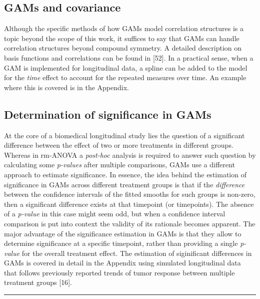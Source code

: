 \documentclass[
]{article}
\begin{document}
\newpage

\hypertarget{gams-and-covariance}{%
\subsection{GAMs and covariance}\label{gams-and-covariance}}

Although the specific methods of how GAMs model correlation structures is a topic beyond the scope of this work, it suffices to say that GAMs can handle correlation structures beyond compound symmetry. A detailed description on basis functions and correlations can be found in {[}52{]}. In a practical sense, when a GAM is implemented for longitudinal data, a spline can be added to the model for the \emph{time} effect to account for the repeated measures over time. An example where this is covered is in the Appendix.

\hypertarget{determination-of-significance-in-gams}{%
\subsection{Determination of significance in GAMs}\label{determination-of-significance-in-gams}}

At the core of a biomedical longitudinal study lies the question of a significant difference between the effect of two or more treatments in different groups. Whereas in rm-ANOVA a \emph{post-hoc} analysis is required to answer such question by calculating some \emph{p-values} after multiple comparisons, GAMs use a different approach to estimate significance. In essence, the idea behind the estimation of significance in GAMs across different treatment groups is that if the \emph{difference} between the confidence intervals of the fitted smooths for such groups is non-zero, then a significant difference exists at that timepoint (or timepoints). The absence of a \emph{p-value} in this case might seem odd, but when a confidence interval comparison is put into context the validity of its rationale becomes apparent. The major advantage of the significance estimation in GAMs is that they allow to determine significance at a specific timepoint, rather than providing a single \emph{p-value} for the overall treatment effect. The estimation of siginificant differences in GAMs is covered in detail in the Appendix using simulated longitudinal data that follows previously reported trends of tumor response between multiple treatment groups {[}16{]}.

\begin{center}\rule{0.5\linewidth}{0.5pt}\end{center}
\end{document}
